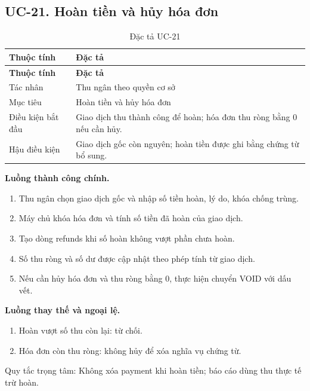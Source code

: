 \clearpage

\subsection{UC-21.\allowbreak{} Hoàn tiền và hủy hóa đơn}
\label{uc:21}

{\small\setlength{\tabcolsep}{3pt}\renewcommand{\arraystretch}{1.12}
\begin{longtable}{@{}L{\textwidth-1.32pt\relax} L{\textwidth-4.68pt\relax}@{}}
\caption{Đặc tả UC-21}\\
\toprule
\textbf{Thuộc tính} & \textbf{Đặc tả}\\\midrule
\endfirsthead
\toprule
\textbf{Thuộc tính} & \textbf{Đặc tả}\\\midrule
\endhead
\bottomrule\endlastfoot
Tác nhân & Thu ngân theo quyền cơ sở\\[3pt]
Mục tiêu & Hoàn tiền và hủy hóa đơn\\[3pt]
Điều kiện bắt đầu & Giao dịch thu thành công để hoàn; hóa đơn thu ròng bằng 0 nếu cần hủy.\allowbreak{}\\[3pt]
Hậu điều kiện & Giao dịch gốc còn nguyên; hoàn tiền được ghi bằng chứng từ bổ sung.\allowbreak{}\\[3pt]
\end{longtable}}
\noindent\textbf{Luồng thành công chính.}
\begin{enumerate}
\item Thu ngân chọn giao dịch gốc và nhập số tiền hoàn, lý do, khóa chống trùng.\allowbreak{}
\item Máy chủ khóa hóa đơn và tính số tiền đã hoàn của giao dịch.\allowbreak{}
\item Tạo dòng refunds khi số hoàn không vượt phần chưa hoàn.\allowbreak{}
\item Số thu ròng và số dư được cập nhật theo phép tính từ giao dịch.\allowbreak{}
\item Nếu cần hủy hóa đơn và thu ròng bằng 0, thực hiện chuyển VOID với dấu vết.\allowbreak{}
\end{enumerate}
\noindent\textbf{Luồng thay thế và ngoại lệ.}
\begin{enumerate}
\item Hoàn vượt số thu còn lại:\allowbreak{} từ chối.\allowbreak{}
\item Hóa đơn còn thu ròng:\allowbreak{} không hủy để xóa nghĩa vụ chứng từ.\allowbreak{}
\end{enumerate}
Quy tắc trọng tâm:\allowbreak{} Không xóa payment khi hoàn tiền; báo cáo dùng thu thực tế trừ hoàn.\allowbreak{}

